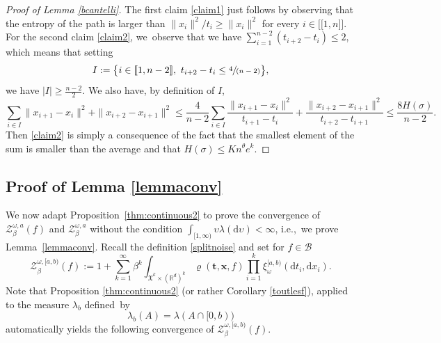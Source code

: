 \documentclass[11pt]{article}
\newcommand{\ie}{i.e.,\xspace}
\numberwithin{equation}{section}
\let\mathcal\mathscr
\newcommand{\spfrac}[2]{\sfrac{#1}{(#2)}}
\newcommand{\lint}{\mathopen{[\![}}
\newcommand{\rint}{\mathclose{]\!]}}
\theoremstyle{definition}
\newcommand{\bt}{\boldsymbol{t}}
\newcommand{\bx}{\boldsymbol{x}}
\newcommand{\dd}{\mathrm{d}}
\newcommand{\cB}{{\ensuremath{\mathcal B}} }
\newcommand{\cZ}{{\ensuremath{\mathcal Z}} }
\newcommand{\bbR}{{\ensuremath{\mathbb R}} }
\let\gb\beta
\let\gl\lambda
\let\ups\upsilon
\let\go\omega
\begin{document}
\begin{proof}[Proof of Lemma \ref{bcantelli}]
The first claim \eqref{claim1} just follows by observing that the entropy of the path is
larger than $\|x_i\|^2/t_i \ge \|x_i\|^2$ for every $i\in \lint 1, n\rint$.
For the second claim \eqref{claim2}, we~observe that
we have
$\sum_{i=1}^{n-2}(t_{i+2}-t_i)\le 2$,
which means that setting
\[
I:= \bigl\{ i\in \lint 1,n-2\rint, \ t_{i+2}-t_i\le \spfrac{4 }{n-2} \bigr\},
\]
we have $|I|\ge \frac{n-2}{2}$. We also have, by definition of $I$,
\begin{equation*}
\sum_{i\in I} \|x_{i+1}-x_i \|^2+\|x_{i+2}-x_{i+1}\|^2\le \frac{4 }{n-2}
\sum_{i\in I}\frac{\|x_{i+1}-x_i\|^2}{t_{i+1}-t_i}+\frac{\|x_{i+2}-x_{i+1}\|^2}{t_{i+2} -t_{i+1}}
\le \frac{8 H(\sigma) }{n-2}.
\end{equation*}
Then \eqref{claim2} is simply a consequence of the fact that
the smallest element of the sum is smaller than the average
and that $H(\sigma) \leq K n^{\theta} e^k$.
\end{proof}

\subsection{Proof of Lemma \ref{lemmaconv}}
\label{sec:lemmaconv}

We now adapt Proposition~\ref{thm:continuous2}
to prove the convergence of $\cZ_{\gb}^{\go,a}(f)$ and $\cZ_{\gb}^{\go,a}$
without the condition $\int_{[1,\infty)} \ups \lambda(\dd \ups) <\infty$, \ie ~we prove Lemma~\ref{lemmaconv}.
Recall the definition \eqref{splitnoise}
and set for $f\in \cB$
\begin{equation}\label{trunkaparti}
\cZ^{\go,[a,b)}_{\beta}(f):=1+\sum_{k=1}^\infty \beta^k\int_{ \mathfrak{X}^k \times (\bbR^d)^k} \varrho(\bt, \bx, f) \prod_{i=1}^k \xi^{[a,b)}_{\go} (\dd t_i, \dd x_i).
\end{equation}
Note that Proposition \ref{thm:continuous2} (or rather Corollary \ref{toutlesf}), applied to the measure $\gl_b$ defined~by
\begin{equation}\label{glbdef}
\gl_b(A)=\gl(A\cap[0,b))
\end{equation}
automatically yields the following convergence of $\cZ^{\go,[a,b)}_{\beta}(f)$.
\end{document}
